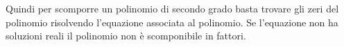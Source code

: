
Quindi per scomporre un polinomio di secondo grado basta trovare gli zeri del 
polinomio risolvendo l'equazione associata al polinomio.
Se l'equazione non ha soluzioni reali il polinomio non è scomponibile in 
fattori.


